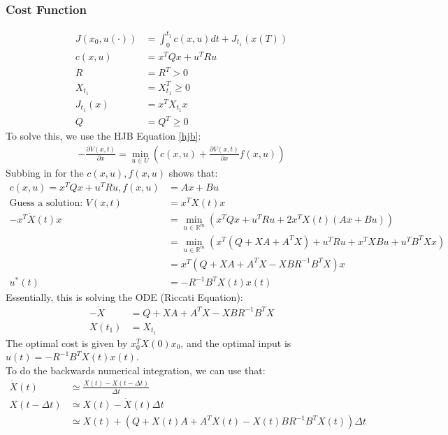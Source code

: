 \documentclass{article}
\begin{document}
\subsubsection*{Cost Function}
\[
\begin{aligned}
    J(x_0,u(\cdot)) &= \int_0^{t_1} c(x,u)dt + J_{t_1} (x(T)) \\
    c(x,u) &= x^T Qx + u^T R u \\
    R &= R^T > 0 \\
    X_{t_1} &= X_{t_1}^T \geq 0 \\
    J_{t_1}(x) &= x^T X_{t_1}x \\ 
    Q &= Q^T \geq 0
\end{aligned}
\]
To solve this, we use the HJB Equation \eqref{hjb}:
\[
\begin{aligned}
    - \frac{\partial V(x,t)}{\partial x} = \min_{u \in U} \left( c(x,u)  + \frac{\partial V(x,t)}{\partial x} f(x,u)  \right)
\end{aligned}
\]
Subbing in for the $c(x,u), f(x,u)$ shows that:
\[
\begin{aligned}
    c(x,u) = x^T Q x + u^T R u, f(x,u) &= Ax + Bu \\
    \text{Guess a solution: } V(x,t) &= x^T X(t)x \\
    -x^T \dot X(t) x &= \min_{u \in \mathbb{R}^m} \left( x^T Q x + u^T R u + 2 x^T X(t)(Ax + Bu) \right) \\
    &= \min_{u \in \mathbb{R}^m} \left( x^T(Q + XA + A^T X) + u^T R u + x^T XBu + u^T B^T Xx \right) \\
    &= x^T(Q + XA + A^T X - XBR^{-1}B^T X)x \\
    u^*(t) &= -R^{-1}B^T X(t) x(t)
\end{aligned}
\]
Essentially, this is solving the ODE (Riccati Equation): 
\[
\begin{aligned}
    - \dot X &= Q + XA + A^T X - XBR^{-1}B^T X \\
    X(t_1) &= X_{t_1}
\end{aligned}
\]
The optimal cost is given by $x_0^T X(0) x_0$, and the optimal input is $u(t) = -R^{-1} B^T X(t) x(t)$. \\
To do the backwards numerical integration, we can use that:
\[
\begin{aligned}
    \dot X (t) &\simeq \frac{X(t) - X(t-\Delta t)}{\Delta t}\\
    X(t - \Delta t) &\simeq X(t) - \dot X(t) \Delta t \\
    &\simeq X(t) + (Q + X(t) A + A^T X(t) - X(t) BR^{-1}B^T X(t)) \Delta t
\end{aligned}
\]
\end{document}

